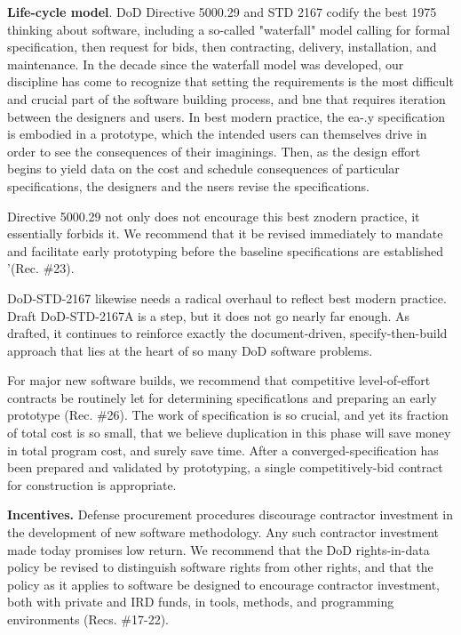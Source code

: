\documentclass[12pt]{article}
\begin{document}
\textbf{Life-cycle model}. DoD Directive 5000.29 and STD 2167 codify the best 1975 thinking
about software, including a so-called "waterfall" model calling for formal specification, then
request for bids, then contracting, delivery, installation, and maintenance. In the decade
since the waterfall model was developed, our discipline has come to recognize that setting
the requirements is the most difficult and crucial part of the software building process, and
bne that requires iteration between the designers and users. In best modern practice, the
ea-.y specification is embodied in a prototype, which the intended users can themselves
drive in order to see the consequences of their imaginings. Then, as the design effort
begins to yield data on the cost and schedule consequences of particular specifications, the
designers and the nsers revise the specifications.

Directive 5000.29 not only does not encourage this best znodern practice, it essentially
forbids it. We recommend that it be revised immediately to mandate and facilitate early
prototyping before the baseline specifications are established '(Rec. \#23).

DoD-STD-2167 likewise needs a radical overhaul to reflect best modern practice. Draft
DoD-STD-2167A is a step, but it does not go nearly far enough. As drafted, it continues to
reinforce exactly the document-driven, specify-then-build approach that lies at the heart
of so many DoD software problems.

For major new software builds, we recommend that competitive level-of-effort contracts
be routinely let for determining specificatlons and preparing an early prototype (Rec. \#26).
The work of specification is so crucial, and yet its fraction of total cost is so small, that
we believe duplication in this phase will save money in total program cost, and surely save
time. After a converged-specification has been prepared and validated by prototyping, a
single competitively-bid contract for construction is appropriate.

\textbf{Incentives.} Defense procurement procedures discourage contractor investment in the
development of new software methodology. Any such contractor investment made today
promises low return. We recommend that the DoD rights-in-data policy be revised to
distinguish software rights from other rights, and that the policy as it applies to software
be designed to encourage contractor investment, both with private and IRD funds, in tools,
methods, and programming environments (Recs. \#17-22).
\end{document}
